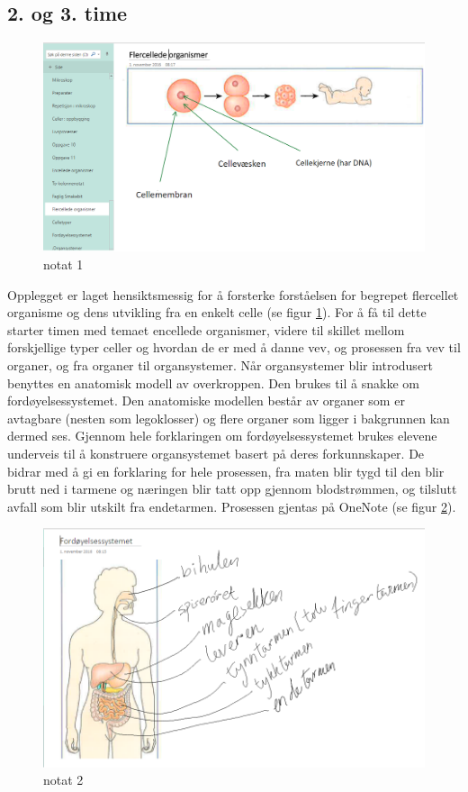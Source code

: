 \documentclass[main.tex]{subfiles}
\begin{document}
\subsection*{2. og 3. time}

\begin{figure}[h!]
\includegraphics[scale = 0.6]{../figures/onenote_flercellet.png}
\caption{notat 1}
\label{fig:notat1}
\end{figure}

\hspace{-6mm}Opplegget er laget hensiktsmessig for å forsterke forståelsen for begrepet flercellet organisme og dens utvikling fra 
en enkelt celle (se figur \ref{fig:notat1}). For å få til dette starter timen med temaet encellede organismer, 
videre til skillet mellom forskjellige typer celler og hvordan de er med å danne vev, og prosessen fra vev til
organer, og fra organer til organsystemer. Når organsystemer blir introdusert benyttes 
en anatomisk modell av overkroppen. Den brukes til å snakke om fordøyelsessystemet.
Den anatomiske modellen består av organer som er avtagbare (nesten som legoklosser) og flere organer 
som ligger i bakgrunnen kan dermed ses. Gjennom hele forklaringen om fordøyelsessystemet brukes
elevene underveis til å konstruere organsystemet basert på deres forkunnskaper. 
De bidrar med å gi en forklaring for hele prosessen, fra maten blir tygd til den blir brutt ned i tarmene 
og næringen blir tatt opp gjennom blodstrømmen, og tilslutt avfall som blir utskilt fra endetarmen. 
Prosessen gjentas på OneNote (se figur \ref{fig:notat2}). 

\begin{figure}[h!]
\includegraphics[scale = 0.6]{../figures/onenote_fordoyelse.png}
\caption{notat 2}
\label{fig:notat2}
\end{figure}
\end{document}

